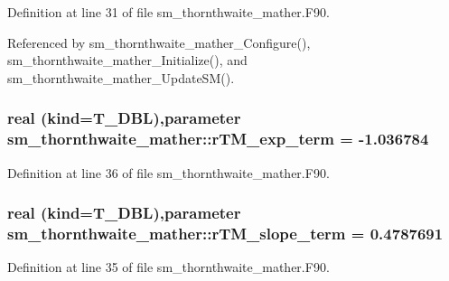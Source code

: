 Definition at line 31 of file sm\_\-thornthwaite\_\-mather.F90.



Referenced by sm\_\-thornthwaite\_\-mather\_\-Configure(), sm\_\-thornthwaite\_\-mather\_\-Initialize(), and sm\_\-thornthwaite\_\-mather\_\-UpdateSM().

\hypertarget{namespacesm__thornthwaite__mather_a001111c742752b811654e00f9ae3fab4}{
\subsubsection[{rTM\_\-exp\_\-term}]{\setlength{\rightskip}{0pt plus 5cm}real (kind=T\_\-DBL),parameter {\bf sm\_\-thornthwaite\_\-mather::rTM\_\-exp\_\-term} = -\/1.036784}}
\label{namespacesm__thornthwaite__mather_a001111c742752b811654e00f9ae3fab4}


Definition at line 36 of file sm\_\-thornthwaite\_\-mather.F90.

\hypertarget{namespacesm__thornthwaite__mather_aacf86966e860d48ccfc3dd81a5d95386}{
\subsubsection[{rTM\_\-slope\_\-term}]{\setlength{\rightskip}{0pt plus 5cm}real (kind=T\_\-DBL),parameter {\bf sm\_\-thornthwaite\_\-mather::rTM\_\-slope\_\-term} = 0.4787691}}
\label{namespacesm__thornthwaite__mather_aacf86966e860d48ccfc3dd81a5d95386}


Definition at line 35 of file sm\_\-thornthwaite\_\-mather.F90.

